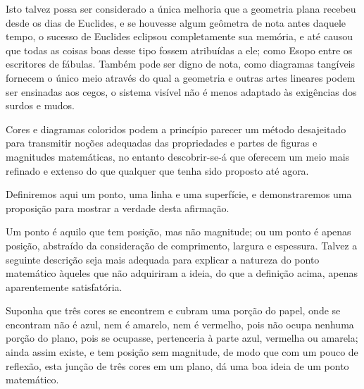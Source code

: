 \documentclass[booklanguage=brazilian]{byrnebook}
\begin{document}
\baselineskip

Isto talvez possa ser considerado a única melhoria que a geometria plana recebeu desde os dias de Euclides, e se houvesse algum geômetra de nota antes daquele tempo, o sucesso de Euclides eclipsou completamente sua memória, e até causou que todas as coisas boas desse tipo fossem atribuídas a ele; como Esopo entre os escritores de fábulas. Também pode ser digno de nota, como diagramas tangíveis fornecem o único meio através do qual a geometria e outras artes lineares podem ser ensinadas aos cegos, o sistema visível não é menos adaptado às exigências dos surdos e mudos.


Cores e diagramas coloridos podem a princípio parecer um método desajeitado para transmitir noções adequadas das propriedades e partes de figuras e magnitudes matemáticas, no entanto descobrir-se-á que oferecem um meio mais refinado e extenso do que qualquer que tenha sido proposto até agora.

Definiremos aqui um ponto, uma linha e uma superfície, e demonstraremos uma proposição para mostrar a verdade desta afirmação.

Um ponto é aquilo que tem posição, mas não magnitude; ou um ponto é apenas posição, abstraído da consideração de comprimento, largura e espessura. Talvez a seguinte descrição seja mais adequada para explicar a natureza do ponto matemático àqueles que não adquiriram a ideia, do que a definição acima, apenas aparentemente satisfatória.

Suponha que três cores \drawCurrentPictureInMargin se encontrem e cubram uma porção do papel, onde se encontram não é azul, nem é amarelo, nem é vermelho, pois não ocupa nenhuma porção do plano, pois se ocupasse, pertenceria à parte azul, vermelha ou amarela; ainda assim existe, e tem posição sem magnitude, de modo que com um pouco de reflexão, esta junção de três cores em um plano, dá uma boa ideia de um ponto matemático.
\end{document}

